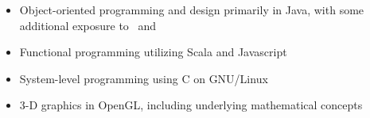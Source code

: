     {\begin{itemize}
        \item Object-oriented programming and design primarily in Java, with some additional
        exposure to \csharp\ and \cpp
        \item Functional programming utilizing Scala and Javascript
        \item System-level programming using C on GNU/Linux
        \item 3-D graphics in OpenGL, including underlying mathematical concepts
    \end{itemize}}
    \vspace*{-\baselineskip}
